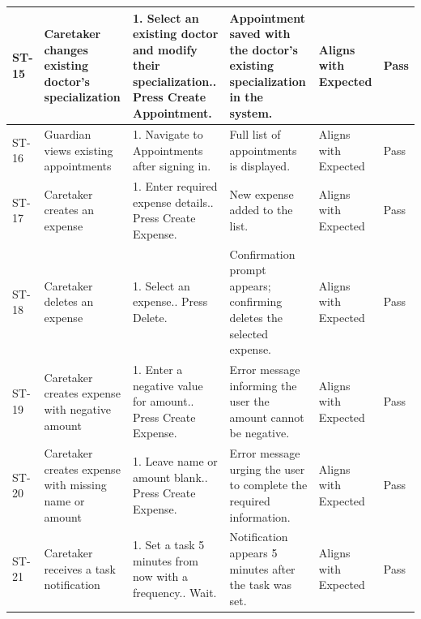 \documentclass[12pt,a4paper]{article}
\begin{document}
\begin{longtable}{|p{1cm}|p{2.5cm}|p{3.5cm}|p{3.5cm}|p{2cm}|p{1.2cm}|}
    ST-15 & Caretaker changes existing doctor's specialization &
        1. Select an existing doctor and modify their specialization.\newline
        2. Press Create Appointment. &
        Appointment saved with the doctor's existing specialization in the system. &
        Aligns with Expected & Pass \\
    \hline
 
    ST-16 & Guardian views existing appointments &
        1. Navigate to Appointments after signing in. &
        Full list of appointments is displayed. &
        Aligns with Expected & Pass \\
    \hline
 
    ST-17 & Caretaker creates an expense &
        1. Enter required expense details.\newline
        2. Press Create Expense. &
        New expense added to the list. &
        Aligns with Expected & Pass \\
    \hline
 
    ST-18 & Caretaker deletes an expense &
        1. Select an expense.\newline
        2. Press Delete. &
        Confirmation prompt appears; confirming deletes the selected expense. &
        Aligns with Expected & Pass \\
    \hline
 
    ST-19 & Caretaker creates expense with negative amount &
        1. Enter a negative value for amount.\newline
        2. Press Create Expense. &
        Error message informing the user the amount cannot be negative. &
        Aligns with Expected & Pass \\
    \hline
 
    ST-20 & Caretaker creates expense with missing name or amount &
        1. Leave name or amount blank.\newline
        2. Press Create Expense. &
        Error message urging the user to complete the required information. &
        Aligns with Expected & Pass \\
    \hline
 
    ST-21 & Caretaker receives a task notification &
        1. Set a task 5 minutes from now with a frequency.\newline
        2. Wait. &
        Notification appears 5 minutes after the task was set. &
        Aligns with Expected & Pass \\
    \hline
 

\end{longtable}
\end{document}

